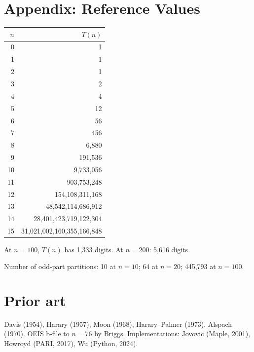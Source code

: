 \documentclass[11pt,letterpaper]{article}
\theoremstyle{definition}
\begin{document}
\newpage


\section*{Appendix: Reference Values}\label{app:values}

\begin{center}
{\small
\begin{tabular}{r|r}
\toprule
$n$ & $T(n)$ \\
\midrule
0 & 1 \\
1 & 1 \\
2 & 1 \\
3 & 2 \\
4 & 4 \\
5 & 12 \\
6 & 56 \\
7 & 456 \\
8 & 6{,}880 \\
9 & 191{,}536 \\
10 & 9{,}733{,}056 \\
11 & 903{,}753{,}248 \\
12 & 154{,}108{,}311{,}168 \\
13 & 48{,}542{,}114{,}686{,}912 \\
14 & 28{,}401{,}423{,}719{,}122{,}304 \\
15 & 31{,}021{,}002{,}160{,}355{,}166{,}848 \\
\bottomrule
\end{tabular}}
\end{center}

\medskip
\noindent At $n = 100$, $T(n)$ has 1{,}333 digits. At $n = 200$: 5{,}616 digits.

\medskip
\noindent Number of odd-part partitions: 10 at $n = 10$; 64 at $n = 20$; 445{,}793 at $n = 100$.

\section*{Prior art}

{\small Davis (1954), Harary (1957), Moon (1968), Harary--Palmer (1973), Alspach (1970). OEIS b-file to $n = 76$ by Briggs. Implementations: Jovovic (Maple, 2001), Howroyd (PARI, 2017), Wu (Python, 2024).}
\end{document}

